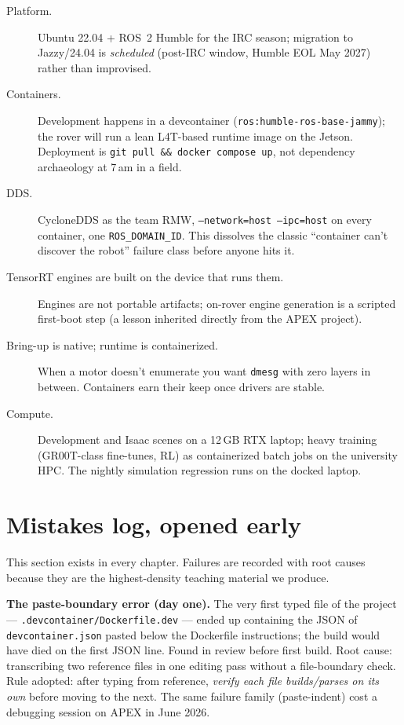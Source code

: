 \begin{description}
  \item[Platform.] Ubuntu 22.04 + ROS~2 Humble for the IRC season; migration to Jazzy/24.04 is
  \emph{scheduled} (post-IRC window, Humble EOL May 2027) rather than improvised.
  \item[Containers.] Development happens in a devcontainer (\texttt{ros:humble-ros-base-jammy});
  the rover will run a lean L4T-based runtime image on the Jetson. Deployment is
  \texttt{git pull \&\& docker compose up}, not dependency archaeology at 7\,am in a field.
  \item[DDS.] CycloneDDS as the team RMW, \texttt{--network=host --ipc=host} on every container,
  one \texttt{ROS\_DOMAIN\_ID}. This dissolves the classic ``container can't discover the
  robot'' failure class before anyone hits it.
  \item[TensorRT engines are built on the device that runs them.] Engines are not portable
  artifacts; on-rover engine generation is a scripted first-boot step (a lesson inherited
  directly from the APEX project).
  \item[Bring-up is native; runtime is containerized.] When a motor doesn't enumerate you want
  \texttt{dmesg} with zero layers in between. Containers earn their keep once drivers are
  stable.
  \item[Compute.] Development and Isaac scenes on a 12\,GB RTX laptop; heavy training
  (GR00T-class fine-tunes, RL) as containerized batch jobs on the university HPC. The nightly
  simulation regression runs on the docked laptop.
\end{description}

\section{Mistakes log, opened early}
\label{sec:mistakes-ch1}

This section exists in every chapter. Failures are recorded with root causes because they are
the highest-density teaching material we produce.

\begin{lesson}
\textbf{The paste-boundary error (day one).} The very first typed file of the project ---
\texttt{.devcontainer/Dockerfile.dev} --- ended up containing the JSON of
\texttt{devcontainer.json} pasted below the Dockerfile instructions; the build would have died
on the first JSON line. Found in review before first build. Root cause: transcribing two
reference files in one editing pass without a file-boundary check. Rule adopted: after typing
from reference, \emph{verify each file builds/parses on its own} before moving to the next.
The same failure family (paste-indent) cost a debugging session on APEX in June 2026.
\end{lesson}
